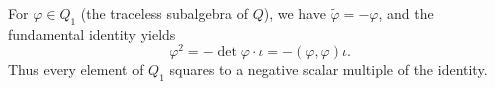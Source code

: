 For $\varphi \in Q_1$ (the traceless subalgebra of $Q$), we have $\tilde{\varphi} = -\varphi$, and the fundamental identity yields
$$
\varphi^2 = -\det \varphi \cdot \iota = -(\varphi, \varphi) \iota.
$$
Thus every element of $Q_1$ squares to a negative scalar multiple of the identity.
